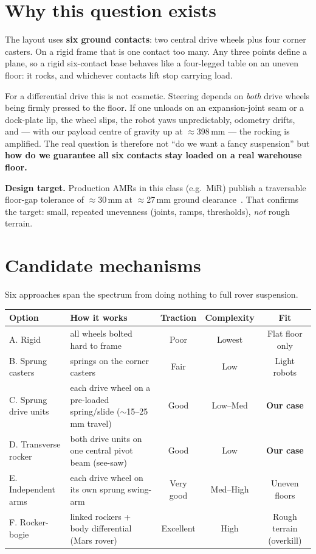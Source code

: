 \documentclass[11pt,a4paper]{article}
\begin{document}
\section{Why this question exists}
The layout uses \textbf{six ground contacts}: two central drive wheels plus four corner casters.
On a rigid frame that is one contact too many. Any three points define a plane, so a rigid
six-contact base behaves like a four-legged table on an uneven floor: it rocks, and whichever
contacts lift stop carrying load.

For a differential drive this is not cosmetic. Steering depends on \emph{both} drive wheels being
firmly pressed to the floor. If one unloads on an expansion-joint seam or a dock-plate lip, the wheel
slips, the robot yaws unpredictably, odometry drifts, and — with our payload centre of gravity up at
$\approx$398\,mm — the rocking is amplified. The real question is therefore not ``do we want a fancy
suspension'' but \textbf{how do we guarantee all six contacts stay loaded on a real warehouse floor.}

\textbf{Design target.} Production AMRs in this class (e.g.\ MiR) publish a traversable floor-gap
tolerance of $\approx$30\,mm at $\approx$27\,mm ground clearance~\cite{mir}. That confirms the target:
small, repeated unevenness (joints, ramps, thresholds), \emph{not} rough terrain.

\section{Candidate mechanisms}
Six approaches span the spectrum from doing nothing to full rover suspension.

\begin{center}\small
\renewcommand{\arraystretch}{1.25}
\begin{tabularx}{\linewidth}{@{}p{3.3cm}Y c c c@{}}
\toprule
\textbf{Option} & \textbf{How it works} & \textbf{Traction} & \textbf{Complexity} & \textbf{Fit} \\
\midrule
A. Rigid & all wheels bolted hard to frame & Poor & Lowest & Flat floor only \\
B. Sprung casters & springs on the corner casters & Fair & Low & Light robots \\
 C. Sprung drive units & each drive wheel on a pre-loaded spring/slide ($\sim$15--25\,mm travel) & Good & Low--Med & \textbf{Our case} \\
 D. Transverse rocker & both drive units on one central pivot beam (see-saw) & Good & Low & \textbf{Our case} \\
E. Independent arms & each drive wheel on its own sprung swing-arm & Very good & Med--High & Uneven floors \\
F. Rocker-bogie & linked rockers + body differential (Mars rover) & Excellent & High & Rough terrain (overkill) \\
\bottomrule
\end{tabularx}
\end{center}
\end{document}
